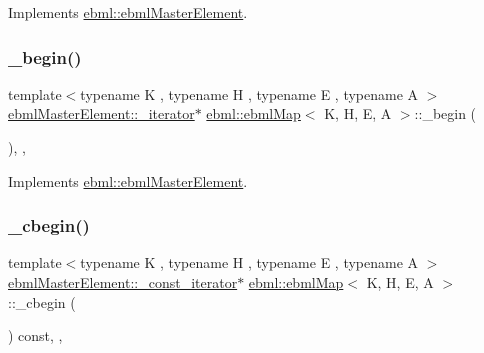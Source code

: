 Implements \mbox{\hyperlink{classebml_1_1ebmlMasterElement_a3af0270846a1ced1719d26dd261f0355}{ebml\+::ebml\+Master\+Element}}.

\mbox{\label{classebml_1_1ebmlMap_a1e395f6d3d365562e5bebc37b3cba8ef}} 
\subsubsection{\texorpdfstring{\+\_\+begin()}{\_begin()}}
{\footnotesize\ttfamily template$<$typename K , typename H , typename E , typename A $>$ \\
\mbox{\hyperlink{classebml_1_1ebmlMasterElement_1_1__iterator}{ebml\+Master\+Element\+::\+\_\+iterator}}$\ast$ \mbox{\hyperlink{classebml_1_1ebmlMap}{ebml\+::ebml\+Map}}$<$ K, H, E, A $>$\+::\+\_\+begin (\begin{DoxyParamCaption}{ }\end{DoxyParamCaption})\hspace{0.3cm}{\ttfamily [override]}, {\ttfamily [protected]}, {\ttfamily [virtual]}}



Implements \mbox{\hyperlink{classebml_1_1ebmlMasterElement_af6fb7a9934e9b8d0c64273ef6944f44b}{ebml\+::ebml\+Master\+Element}}.

\mbox{\label{classebml_1_1ebmlMap_aa2f09d5ea0bf736dc32a4f04732fd4ba}} 
\subsubsection{\texorpdfstring{\+\_\+cbegin()}{\_cbegin()}}
{\footnotesize\ttfamily template$<$typename K , typename H , typename E , typename A $>$ \\
\mbox{\hyperlink{classebml_1_1ebmlMasterElement_1_1__const__iterator}{ebml\+Master\+Element\+::\+\_\+const\+\_\+iterator}}$\ast$ \mbox{\hyperlink{classebml_1_1ebmlMap}{ebml\+::ebml\+Map}}$<$ K, H, E, A $>$\+::\+\_\+cbegin (\begin{DoxyParamCaption}{ }\end{DoxyParamCaption}) const\hspace{0.3cm}{\ttfamily [override]}, {\ttfamily [protected]}, {\ttfamily [virtual]}}




